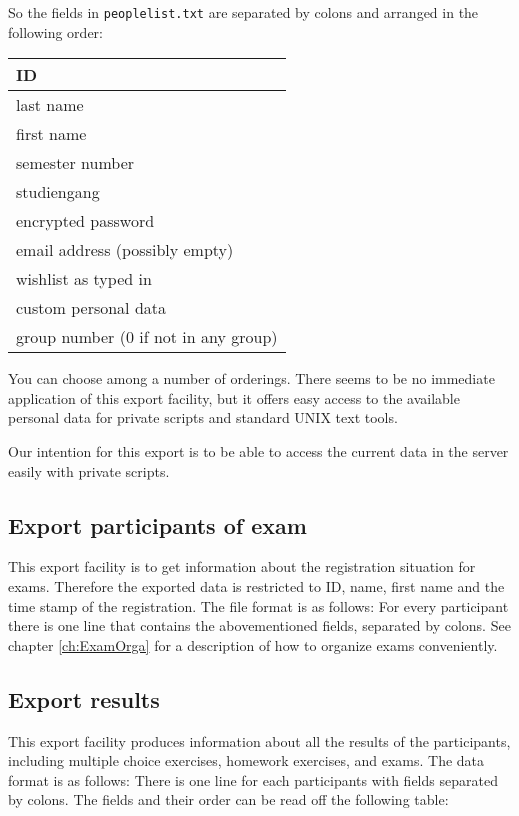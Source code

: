 \documentclass[12pt,openany,a4paper]{book}
\begin{document}
So the fields in \texttt{peoplelist.txt} are separated by colons and
arranged in the following order:

\begin{center}
\begin{tabular}{|l|}
\hline
ID \\
\hline
last name \\
\hline
first name \\
\hline
semester number \\
\hline
studiengang \\
\hline
encrypted password \\
\hline
email address (possibly empty) \\
\hline
wishlist as typed in \\
\hline
custom personal data \\
\hline
group number ($0$ if not in any group) \\
\hline
\end{tabular}
\end{center}

You can choose among a number of orderings. There seems to be no immediate
application of this export facility, but it offers easy access to the
available personal data for private scripts and standard UNIX text
tools.

Our intention for this export is to be able to access the current data
in the server easily with private scripts.


\subsection{Export participants of exam} 
\label{sec:expexamreg}

This export facility is to get
information about the registration situation for exams. Therefore the
exported data is restricted to ID, name, first name and the time stamp 
of the registration. The file format is as follows: For every participant
there is one line that contains the abovementioned fields, separated by
colons. See chapter \ref{ch:ExamOrga} for a description of how to
organize exams conveniently.

\subsection{Export results} 
\label{sec:expresults}

This export facility produces information
about all the results of the participants, including multiple choice
exercises, homework exercises, and exams. The data format is as follows:
There is one line for each participants with fields separated by colons.
The fields and their order can be read off the following table:
\end{document}
